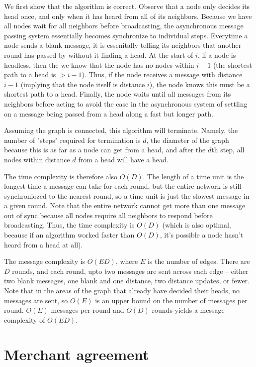 \documentclass{article}
\begin{document}
We first show that the algorithm is correct. Observe that a node only decides its head once, and only when it has heard from all of its neighbors. Because we have all nodes wait
for all neighbors before broadcasting, the asynchronous message passing system essentially becomes synchronize to individual steps. Everytime a node sends a blank message, it is
essenitally telling its neighbors that another round has passed by without it finding a head. At the start of $i$, if a node is headless, then the we know that the node has no
nodes within $i-1$  (the shortest path to a head is $> i-1$). Thus, if the node receives a message with distance $i-1$ (implying that the node itself is distance $i$), the node
knows this must be a shortest path to a head. Finally, the node waits until all messages from its neighbors before acting to avoid the case in the asynchronous system of settling
on a message being passed from a head along a fast but longer path.

Assuming the graph is connected, this algorithm will terminate. Namely, the number of "steps" required for termination is $d$, the diameter of the graph because this is as far as a
node can get from a head, and after the $d$th step, all nodes within distance $d$ from a head will have a head.

The time complexity is therefore also $O(D)$. The length of a time unit is the longest time a message can take for each round, but the entire network is still synchroniozed to the
nearest round, so a time unit is just the slowest message in a given round. Note that the entire network cannot get more than one message out of sync because all nodes require all
neighbors to respond before broadcasting. Thus, the time complexity is $O(D)$ (which is also optimal, because if an algorithm worked faster than $O(D)$, it's possible a node hasn't
heard from a head at all).

The message complexity is $O(ED)$, where $E$ is the number of edges. There are $D$ rounds, and each round, upto two messages are sent across each edge -- either two blank messages,
one blank and one distance, two distance updates, or fewer. Note that in the areas of the graph that already have decided their heads, no messages are sent, so $O(E)$ is an upper
bound on the number of messages per round. $O(E)$ messages per round and $O(D)$ rounds yields a message complexity of $O(ED)$.

\section{Merchant agreement}
\label{problem1.3}
\end{document}

